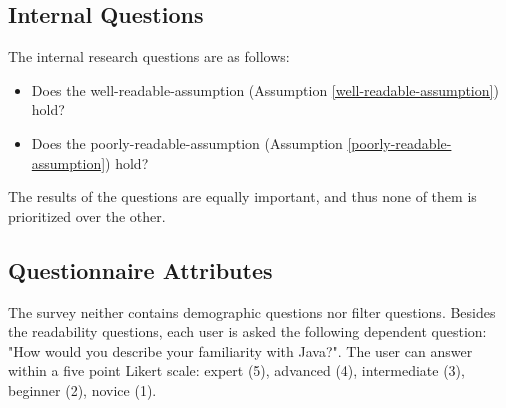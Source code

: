 \documentclass[%
class=scrreprt,
chapterprefix=false,%
open=right,%
twoside=false,%
paper=a4,%
logofile={Logo\_zentral\_farbig\_EN.png},%
thesistype=masterproposal,%
UKenglish,%
]{se2thesis}
\begin{document}
\subsection{Internal Questions} %
The internal research questions are as follows:
\begin{itemize}
	\item Does the well-readable-assumption (Assumption \ref{well-readable-assumption}) hold?
	\item Does the poorly-readable-assumption (Assumption \ref{poorly-readable-assumption}) hold?
\end{itemize}
The results of the questions are equally important, and thus none of them is prioritized over the other.

\subsection{Questionnaire Attributes} \label{questionnaire-attributes}
The survey neither contains demographic questions nor filter questions. Besides the readability questions, each user is asked the following dependent question: "How would you describe your familiarity with Java?". The user can answer within a five point Likert scale: expert (5), advanced (4), intermediate (3), beginner (2), novice (1).

	
	
	
	
\end{document}
